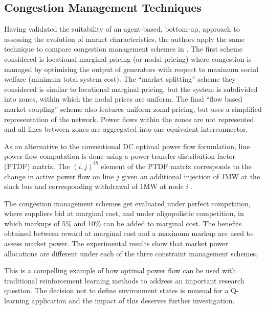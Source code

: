 \subsection{Congestion Management Techniques}
\label{sec:related_cong}
Having validated the suitability of an agent-based, bottom-up, approach to
assessing the evolution of market characteristics, the authors apply the same
technique to compare congestion management schemes in . The
first scheme considered is locational marginal pricing (or nodal pricing) where
congestion is managed by optimising the output of generators with respect to
maximum social welfare (minimum total system cost).
The ``market splitting'' scheme they considered is similar to locational
marginal pricing, but the system is subdivided into zones, within which the
nodal prices are uniform.  The final ``flow based market coupling'' scheme also
features uniform zonal pricing, but uses a simplified representation of the
network.  Power flows within the zones are not represented and all lines between
zones are aggregated into one equivalent interconnector.

As an alternative to the conventional DC optimal power flow formulation, line
power flow computation is done using a power transfer distribution factor (PTDF)
matrix.  The $(i,j)^{th}$ element of the PTDF matrix corresponds to the change
in active power flow on line $j$ given an additional injection of 1MW at the
slack bus and corresponding withdrawal of 1MW at node $i$ \cite{grainger:psa}.

The congestion management schemes get evaluated under perfect competition, where
suppliers bid at marginal cost, and under oligopolistic competition, in which
markups of 5\% and 10\% can be added to marginal cost.  The benefits obtained
between reward at marginal cost and a maximum markup are used to assess market
power.  The experimental results show that market power allocations are
different under each of the three constraint management schemes.

This is a compelling example of how optimal power flow can be used with
traditional reinforcement learning methods to address an important research
question.  The decision not to define environment states is unusual for a
Q-learning application and the impact of this deserves further investigation.

